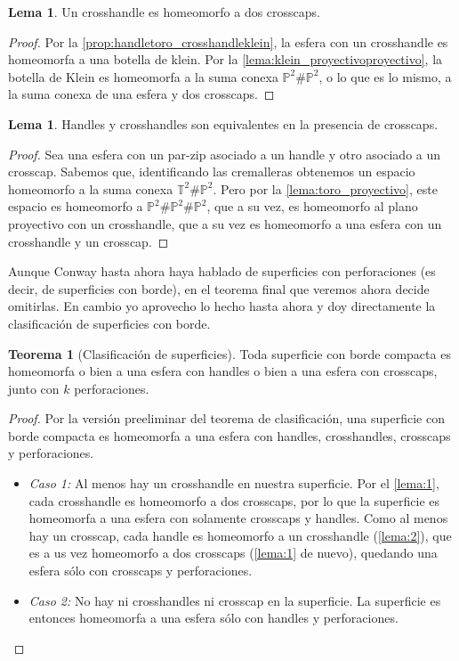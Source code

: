 \documentclass[10pt]{report}
\newcommand{\Toro}{\mathbb{T}^2}
\newcommand{\Proyectivo}{\mathbb{P}^2}
\theoremstyle{definition}
\newtheorem{tma}[defin]{Teorema}
\newtheorem{lema}[defin]{Lema}
\begin{document}
\begin{lema}\label{lema:1}
Un crosshandle es homeomorfo a dos crosscaps.
\end{lema}
\begin{proof}
Por la \autoref{prop:handletoro_crosshandleklein}, la esfera con un crosshandle es homeomorfa a una botella de klein. Por la \autoref{lema:klein_proyectivoproyectivo}, la botella de Klein es homeomorfa a la suma conexa $\Proyectivo \# \Proyectivo$, o lo que es lo mismo, a la suma conexa de una esfera y dos crosscaps.
\end{proof}

\begin{lema}\label{lema:2}
Handles y crosshandles son equivalentes en la presencia de crosscaps.
\end{lema}
\begin{proof}
Sea una esfera con un par-zip asociado a un handle y otro asociado a un crosscap. Sabemos que, identificando las cremalleras obtenemos un espacio homeomorfo a la suma conexa $\Toro \# \Proyectivo$. Pero por la \autoref{lema:toro_proyectivo}, este espacio es homeomorfo a $\Proyectivo \# \Proyectivo \# \Proyectivo$, que a su vez, es homeomorfo al plano proyectivo con un crosshandle, que a su vez es homeomorfo a una esfera con un crosshandle y un crosscap.
\end{proof}
Aunque Conway hasta ahora haya hablado de superficies con perforaciones (es decir, de superficies con borde), en el teorema final que veremos ahora decide omitirlas. En cambio yo aprovecho lo hecho hasta ahora y doy directamente la clasificación de superficies con borde.
\begin{tma}[Clasificación de superficies]
Toda superficie con borde compacta es homeomorfa o bien a una esfera con handles o bien a una esfera con crosscaps, junto con $k$ perforaciones.
\end{tma}
\begin{proof}
Por la versión preeliminar del teorema de clasificación, una superficie con borde compacta es homeomorfa a una esfera con handles, crosshandles, crosscaps y perforaciones.
\begin{itemize}
\item \textit{Caso 1:} Al menos hay un crosshandle en nuestra superficie. Por el \autoref{lema:1}, cada crosshandle es homeomorfo a dos crosscaps, por lo que la superficie es homeomorfa a una esfera con solamente crosscaps y handles. Como al menos hay un crosscap, cada handle es homeomorfo a un crosshandle (\autoref{lema:2}), que es a us vez homeomorfo a dos crosscaps (\autoref{lema:1} de nuevo), quedando una esfera sólo con crosscaps y perforaciones.
\item \textit{Caso 2:} No hay ni crosshandles ni crosscap en la superficie. La superficie es entonces homeomorfa a una esfera sólo con handles y perforaciones.
\end{itemize}
\end{proof}
\end{document}
